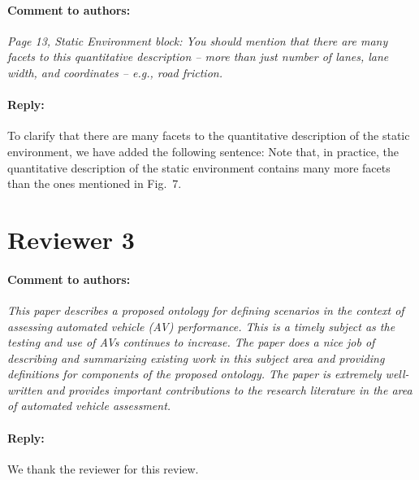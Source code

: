 \documentclass[10pt,final,a4paper,oneside,onecolumn]{article}
\newcommand{\toauthor}{\paragraph*{Comment to authors:} \itshape}
\newcommand{\fromauthor}{\paragraph*{Reply:} \normalfont}
\newcommand{\cstart}{\cbstart\color{red}}
\newcommand{\cend}{\cbend\color{black}}
\begin{document}
\toauthor Page 13, Static Environment block: You should mention that there are many facets to this quantitative description -- more than just number of lanes, lane width, and coordinates -- e.g., road friction.

\fromauthor To clarify that there are many facets to the quantitative description of the static environment, we have added the following sentence: \cstart Note that, in practice, the quantitative description of the static environment contains many more facets than the ones mentioned in Fig.~7.\cend



\section*{Reviewer 3}

\toauthor This paper describes a proposed ontology for defining scenarios in the context of assessing automated vehicle (AV) performance. This is a timely subject as the testing and use of AVs continues to increase. The paper does a nice job of describing and summarizing existing work in this subject area and providing definitions for components of the proposed ontology. The paper is extremely well-written and provides important contributions to the research literature in the area of automated vehicle assessment.

\fromauthor We thank the reviewer for this review.



\printbibliography
\end{document}
